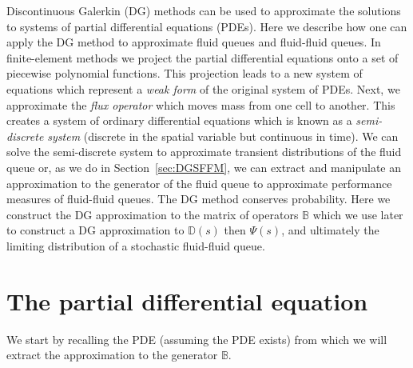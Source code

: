 Discontinuous Galerkin (DG) methods can be used to approximate the solutions to systems of partial differential equations (PDEs). Here we describe how one can apply the DG method to approximate fluid queues and fluid-fluid queues. In finite-element methods we project the partial differential equations onto a set of piecewise polynomial functions. This projection leads to a new system of equations which represent a \textit{weak form} of the original system of PDEs. Next, we approximate the \textit{flux operator} which moves mass from one cell to another. This creates a system of ordinary differential equations which is known as a \emph{semi-discrete system} (discrete in the spatial variable but continuous in time). We can solve the semi-discrete system to approximate transient distributions of the fluid queue or, as we do in Section~\ref{sec:DGSFFM}, we can extract and manipulate an approximation to the generator of the fluid queue to approximate performance measures of fluid-fluid queues. The DG method conserves probability. Here we construct the DG approximation to the matrix of operators \(\mathbb B\) which we use later to construct a DG approximation to \(\mathbb D(s)\) then \(\mathbb\Psi(s)\), and ultimately the limiting distribution of a stochastic fluid-fluid queue. 

\section{The partial differential equation}
We start by recalling the PDE (assuming the PDE exists) from which we will extract the approximation to the generator \(\mathbb B\). 

